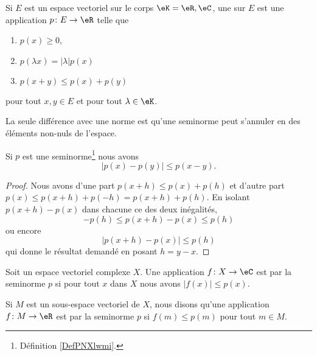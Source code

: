 \begin{definition}  \label{DefPNXlwmi}
	Si \( E\) est un espace vectoriel sur le corps \( \eK=\eR,\eC\), une  sur \( E\) est une application \( p\colon E\to \eR\) telle que
	\begin{enumerate}
		\item
		      \( p(x)\geq 0\),
		\item   \label{ItemSHnimhDii}
		      \( p(\lambda x)=| \lambda |p(x)\)
		\item   \label{ItemSHnimhDiii}
		      \( p(x+y)\leq p(x)+p(y)\)
	\end{enumerate}
	pour tout \( x,y\in E\) et pour tout \( \lambda\in \eK\).
\end{definition}

La seule différence avec une norme est qu'une seminorme peut s'annuler en des éléments non-nuls de l'espace.

\begin{lemma}
	Si \( p\) est une seminorme\footnote{Définition \ref{DefPNXlwmi}.} nous avons
	\begin{equation}
		| p(x)-p(y) |\leq p(x-y).
	\end{equation}
\end{lemma}

\begin{proof}
	Nous avons d'une part \( p(x+h)\leq p(x)+p(h)\) et d'autre part \( p(x)\leq p(x+h)+p(-h)=p(x+h)+p(h)\). En isolant \( p(x+h)-p(x)\) dans chacune ce des deux inégalités,
	\begin{equation}
		-p(h)\leq p(x+h)-p(x)\leq p(h)
	\end{equation}
	ou encore
	\begin{equation}
		|p(x+h)-p(x)|\leq p(h)
	\end{equation}
	qui donne le résultat demandé en posant \( h=y-x\).
\end{proof}

\begin{definition}		\label{DEFooNFOAooRAUuOk}
	Soit un espace vectoriel complexe \( X\). Une application \(f \colon X\to \eC  \) est  par la seminorme \( p\) si pour tout \( x\) dans \( X\) nous avons \( | f(x) |\leq p(x)\).

	Si \( M\) est un sous-espace vectoriel de \( X\), nous disons qu'une application \(f \colon M\to \eR  \) est  par la seminorme \( p\) si \( f(m)\leq p(m)\) pour tout \( m\in M\).
\end{definition}

